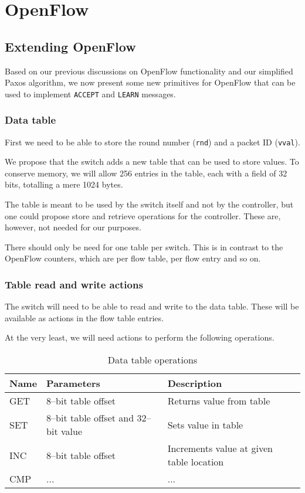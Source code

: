 \chapter{OpenFlow}


\section{Extending OpenFlow}

Based on our previous discussions on OpenFlow functionality and our
simplified Paxos algorithm, we now present some new primitives for OpenFlow
that can be used to implement \texttt{ACCEPT} and \texttt{LEARN} messages.

\subsection{Data table}

First we need to be able to store the round number (\texttt{rnd}) and a
packet ID (\texttt{vval}).

We propose that the switch adds a new table that can be used to store
values.  To conserve memory, we will allow 256 entries in the table, each
with a field of 32 bits, totalling a mere 1024 bytes.

The table is meant to be used by the switch itself and not by the
controller, but one could propose store and retrieve operations for the
controller.  These are, however, not needed for our purposes.

There should only be need for one table per switch.  This is in contrast to
the OpenFlow counters, which are per flow table, per flow entry and so on.

\subsection{Table read and write actions}

The switch will need to be able to read and write to the data table.
These will be available as actions in the flow table entries.

At the very least, we will need actions to perform the following operations.


\begin{table}[H]
  \begin{tabular}{|l|l|l|}
    \hline \textbf{Name} & \textbf{Parameters} & \textbf{Description} \\
    \hline GET & 8--bit table offset & Returns value from table \\
    \hline SET & 8--bit table offset and 32--bit value & Sets value in table \\
    \hline INC & 8--bit table offset & Increments value at given table location \\
    \hline CMP & ... & ... \\
    \hline
  \end{tabular}
  \caption{Data table operations}
  \label{extended.openflow.operations}
\end{table}

